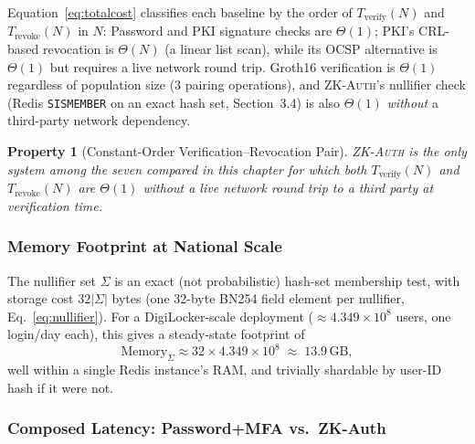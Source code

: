 \documentclass[12pt,a4paper,oneside]{report}
\newtheorem{property}{Property}[chapter]
\begin{document}
Equation~\ref{eq:totalcost} classifies each baseline by the order of
$T_{\text{verify}}(N)$ and $T_{\text{revoke}}(N)$ in $N$:
Password and PKI signature checks are $\Theta(1)$; PKI's CRL-based
revocation is $\Theta(N)$ (a linear list scan), while its OCSP
alternative is $\Theta(1)$ but requires a live network round trip.
Groth16 verification is $\Theta(1)$ regardless of population size (3
pairing operations), and \textsc{ZK-Auth}'s nullifier check
(Redis \texttt{SISMEMBER} on an exact hash set, Section~3.4) is also
$\Theta(1)$ \emph{without} a third-party network dependency.

\begin{property}[Constant-Order Verification--Revocation Pair]
\textsc{ZK-Auth} is the only system among the seven compared in this
chapter for which \emph{both} $T_{\text{verify}}(N)$ and
$T_{\text{revoke}}(N)$ are $\Theta(1)$ without a live network round
trip to a third party at verification time.
\label{prop:constant_order}
\end{property}

\subsubsection{Memory Footprint at National Scale}

The nullifier set $\Sigma$ is an exact (not probabilistic) hash-set
membership test, with storage cost $32|\Sigma|$ bytes (one 32-byte
BN254 field element per nullifier, Eq.~\ref{eq:nullifier}). For a
DigiLocker-scale deployment ($\approx 4.349\times10^{8}$ users, one
login/day each), this gives a steady-state footprint of
\begin{equation}
\text{Memory}_\Sigma \approx 32 \times 4.349\times10^{8}
\;\approx\; 13.9\,\text{GB},
\label{eq:nullifier_memory_digilocker}
\end{equation}
well within a single Redis instance's RAM, and trivially shardable by
user-ID hash if it were not.

\subsubsection{Composed Latency: Password+MFA vs.\ ZK-Auth}
\end{document}
